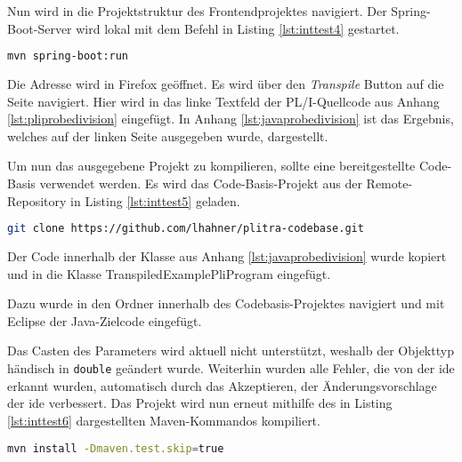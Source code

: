 Nun wird in die Projektstruktur des Frontendprojektes navigiert. Der Spring-Boot-Server wird lokal mit dem Befehl in Listing \ref{lst:inttest4} gestartet.

\begin{lstlisting}[language=Bash, caption=Starten des Spring-Boot-Servers, label={lst:inttest4}]
mvn spring-boot:run
\end{lstlisting}

Die Adresse  wird in Firefox geöffnet. Es wird über den \emph{Transpile} Button auf die Seite  navigiert. Hier wird in das linke Textfeld der PL/I-Quellcode aus Anhang \ref{lst:pliprobedivision} eingefügt. In Anhang \ref{lst:javaprobedivision} ist das Ergebnis, welches auf der linken Seite ausgegeben wurde, dargestellt.

Um nun das ausgegebene Projekt zu kompilieren, sollte eine bereitgestellte Code-Basis verwendet werden. Es wird das Code-Basis-Projekt aus der Remote-Repository in Listing \ref{lst:inttest5} geladen.

\begin{lstlisting}[language=Bash, caption=Laden der Code-Basis, label={lst:inttest5}]
git clone https://github.com/lhahner/plitra-codebase.git
\end{lstlisting}

Der Code innerhalb der Klasse aus Anhang \ref{lst:javaprobedivision} wurde kopiert und in die Klasse TranspiledExamplePliProgram eingefügt. 

Dazu wurde in den Ordner  innerhalb des Codebasis-Projektes navigiert und mit Eclipse der Java-Zielcode eingefügt.

Das Casten des Parameters wird aktuell nicht unterstützt, weshalb der Objekttyp händisch
in \verb+double+ geändert wurde. Weiterhin wurden alle Fehler, die von der \ac{ide} erkannt wurden, automatisch durch das Akzeptieren, der Änderungsvorschlage der  \ac{ide}  verbessert.
Das Projekt wird nun erneut mithilfe des in Listing \ref{lst:inttest6} dargestellten Maven-Kommandos kompiliert.

\begin{lstlisting}[language=Bash, caption=Kompilieren des Projekts, label={lst:inttest6}]
mvn install -Dmaven.test.skip=true
\end{lstlisting}

